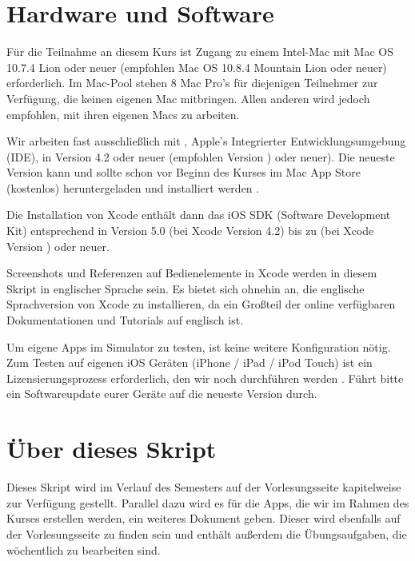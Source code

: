 \documentclass[parskip=half, final]{scrreprt}
\begin{document}
\section{Hardware und Software} \label{sec:hwsw}

Für die Teilnahme an diesem Kurs ist Zugang zu einem Intel-Mac mit Mac OS 10.7.4 Lion oder neuer (empfohlen Mac OS 10.8.4 Mountain Lion oder neuer) erforderlich. Im Mac-Pool stehen 8 Mac Pro's für diejenigen Teilnehmer zur Verfügung, die keinen eigenen Mac mitbringen. Allen anderen wird jedoch empfohlen, mit ihren eigenen Macs zu arbeiten.

Wir arbeiten fast ausschließlich mit , Apple's Integrierter Entwicklungsumgebung (IDE), in Version 4.2 oder neuer (empfohlen Version \vxcode{}) oder neuer). Die neueste Version kann und sollte schon vor Beginn des Kurses im Mac App Store (kostenlos) heruntergeladen und installiert werden .

Die Installation von Xcode enthält dann das iOS SDK (Software Development Kit) entsprechend in Version 5.0 (bei Xcode Version 4.2) bis zu \vios{} (bei Xcode Version \vxcode{}) oder neuer.

Screenshots und Referenzen auf Bedienelemente in Xcode werden in diesem Skript in englischer Sprache sein. Es bietet sich ohnehin an, die englische Sprachversion von Xcode zu installieren, da ein Großteil der online verfügbaren Dokumentationen und Tutorials auf englisch ist.

Um eigene Apps im Simulator zu testen, ist keine weitere Konfiguration nötig. Zum Testen auf eigenen iOS Geräten (iPhone / iPad / iPod Touch) ist ein Lizensierungsprozess erforderlich, den wir noch durchführen werden . Führt bitte ein Softwareupdate eurer Geräte auf die neueste Version durch.

\section{Über dieses Skript}

Dieses Skript wird im Verlauf des Semesters auf der Vorlesungsseite  kapitelweise zur Verfügung gestellt. Parallel dazu wird es für die Apps, die wir im Rahmen des Kurses erstellen werden, ein weiteres Dokument geben. Dieser  wird ebenfalls auf der Vorlesungsseite zu finden sein und enthält außerdem die Übungsaufgaben, die wöchentlich zu bearbeiten sind.
\end{document}
